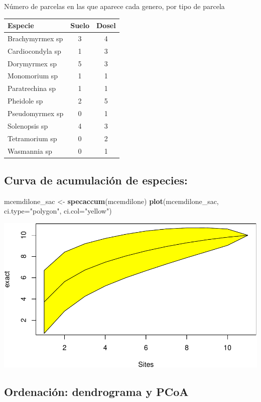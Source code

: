\documentclass[11pt,]{article}
\newenvironment{Shaded}{\begin{snugshade}}{\end{snugshade}}
\newcommand{\KeywordTok}[1]{\textcolor[rgb]{0.13,0.29,0.53}{\textbf{#1}}}
\newcommand{\DataTypeTok}[1]{\textcolor[rgb]{0.13,0.29,0.53}{#1}}
\newcommand{\StringTok}[1]{\textcolor[rgb]{0.31,0.60,0.02}{#1}}
\newcommand{\NormalTok}[1]{#1}
\begin{document}
Número de parcelas en las que aparece cada genero, por tipo de parcela

\begin{longtable}[]{@{}lcc@{}}
\toprule
Especie & Suelo & Dosel\tabularnewline
\midrule
\endhead
Brachymyrmex sp & 3 & 4\tabularnewline
Cardiocondyla sp & 1 & 3\tabularnewline
Dorymyrmex sp & 5 & 3\tabularnewline
Monomorium sp & 1 & 1\tabularnewline
Paratrechina sp & 1 & 1\tabularnewline
Pheidole sp & 2 & 5\tabularnewline
Pseudomyrmex sp & 0 & 1\tabularnewline
Solenopsis sp & 4 & 3\tabularnewline
Tetramorium sp & 0 & 2\tabularnewline
Wasmannia sp & 0 & 1\tabularnewline
\bottomrule
\end{longtable}

\subsection{Curva de acumulación de
especies:}\label{curva-de-acumulaciuxf3n-de-especies}

\begin{Shaded}
\begin{Highlighting}[]
\NormalTok{mcemdilone_sac <-}\StringTok{ }\KeywordTok{specaccum}\NormalTok{(mcemdilone)}
\KeywordTok{plot}\NormalTok{(mcemdilone_sac, }\DataTypeTok{ci.type=}\StringTok{"polygon"}\NormalTok{, }\DataTypeTok{ci.col=}\StringTok{"yellow"}\NormalTok{)  }
\end{Highlighting}
\end{Shaded}

\includegraphics{manuscrito_files/figure-latex/curva_acumulacion_emdilone-1.pdf}

\subsection{Ordenación: dendrograma y
PCoA}\label{ordenaciuxf3n-dendrograma-y-pcoa}
\end{document}
